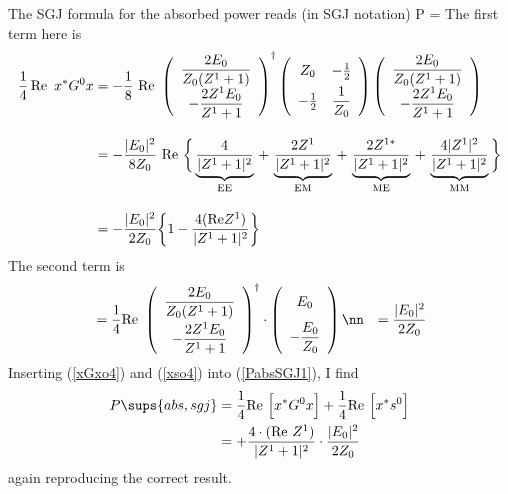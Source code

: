\documentclass{article}
\begin{document}
The SGJ formula for the absorbed power reads (in SGJ notation)
{
 P
 =\Big[ x^* G^0 x + x^* s^0 \Big]
}
The first term here is 
\begin{align}
 \frac{1}{4}\,\text{Re }\,x^* G^0 x 
&= 
 -\frac{1}{8}\text{ Re }
 \left(\begin{array}{c}
 \displaystyle{ \frac{2E_0}{Z_0(Z^1+1)} }
 \\[5pt]
 \displaystyle{ -\frac{2Z^1 E_0}{Z^1+1} }
 \end{array}\right)^\dagger 
 \left(\begin{array}{cc}
 \displaystyle{ \vphantom{\frac{1}{Z_0}} Z_0 } & -\frac{1}{2}
 \\[5pt]
 -\frac{1}{2} & \displaystyle{\frac{1}{Z_0}}
 \end{array} \right)
 \left(\begin{array}{c}
 \displaystyle{ \frac{2E_0}{Z_0(Z^1+1)} }
 \\[5pt]
 \displaystyle{ -\frac{2Z^1 E_0}{Z^1+1} }
 \end{array}\right)
\nonumber\\[10pt]
&= -\frac{|E_0|^2}{8Z_0}\text{ Re }
   \bigg\{   \underbrace{ \frac{4}{|Z^1+1|^2} }_{\text{EE}} 
          \,+\,\underbrace{ \frac{2Z^1}{|Z^1+1|^2} }_{\text{EM}} 
          \,+\,\underbrace{ \frac{2Z^{1*}}{|Z^1+1|^2} }_{\text{ME}}
          \,+\,\underbrace{ \frac{4|Z^1|^2}{|Z^1+1|^2} }_{\text{MM}}
   \bigg\}
\nonumber\\[10pt]
&= -\frac{|E_0|^2}{2Z_0}
   \bigg\{ 1 - \frac{4(\text{Re} Z^1)}{|Z^1+1|^2} \bigg\}
\label{xGxo4}
\end{align}
The second term is 
\begin{align}
&= \frac{1}{4}\text{Re }
 \left(\begin{array}{c}
 \displaystyle{ \frac{2E_0}{Z_0(Z^1+1)} }
 \\[8pt]
 \displaystyle{ -\frac{2Z^1 E_0}{Z^1+1} }
 \end{array}\right)^\dagger 
 \cdot 
 \left(\begin{array}{c}
 \displaystyle{ \vphantom{\frac{1}{Z_0}} E_0 }
 \\[8pt]
 \displaystyle{ -\frac{E_0}{Z_0} }
 \end{array}\right)
\nn
&= \frac{|E_0|^2}{2Z_0}
\label{xso4}
\end{align}
Inserting (\ref{xGxo4}) and (\ref{xso4}) into (\ref{PabsSGJ1}), 
I find
\begin{align*}
 P\sups{abs,{\sc sgj}}
 &=  \frac{1}{4}\text{Re }\Big[ x^* G^0 x \Big]
   +\frac{1}{4}\text{Re }\Big[ x^* s^0 \Big]
\\
 &= +\frac{4\cdot(\text{Re }Z^1)}{|Z^1+1|^2}\cdot \frac{|E_0|^2}{2Z_0}
\end{align*}
again reproducing the correct result.
\end{document}
